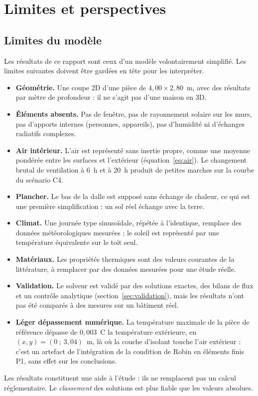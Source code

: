 \section{Limites et perspectives}\label{sec:limites}

\subsection{Limites du modèle}
Les résultats de ce rapport sont ceux d'un modèle volontairement simplifié. Les limites suivantes doivent
être gardées en tête pour les interpréter.
\begin{itemize}
	\item \textbf{Géométrie.} Une coupe 2D d'une pièce de $4{,}00\times2{,}80$~m, avec des résultats par mètre de
	profondeur : il ne s'agit pas d'une maison en 3D.
	\item \textbf{Éléments absents.} Pas de fenêtre, pas de rayonnement solaire sur les murs, pas d'apports
	internes (personnes, appareils), pas d'humidité ni d'échanges radiatifs complexes.
	\item \textbf{Air intérieur.} L'air est représenté sans inertie propre, comme une moyenne pondérée entre les
	surfaces et l'extérieur (équation~\eqref{eq:air}). Le changement brutal de ventilation à 6~h et à 20~h
	produit de petites marches sur la courbe du scénario C4.
	\item \textbf{Plancher.} Le bas de la dalle est supposé sans échange de chaleur, ce qui est une première
	simplification : un sol réel échange avec la terre.
	\item \textbf{Climat.} Une journée type sinusoïdale, répétée à l'identique, remplace des données
	météorologiques mesurées ; le soleil est représenté par une température équivalente sur le toit seul.
	\item \textbf{Matériaux.} Les propriétés thermiques sont des valeurs courantes de la littérature, à remplacer
	par des données mesurées pour une étude réelle.
	\item \textbf{Validation.} Le solveur est validé par des solutions exactes, des bilans de flux et un contrôle
	analytique (section~\ref{sec:validation}), mais les résultats n'ont pas été comparés à des mesures sur un
	bâtiment réel.
	\item \textbf{Léger dépassement numérique.} La température maximale de la pièce de référence dépasse de
	$0{,}003$~\textdegree C la température extérieure, en $(x,y)=(0\ ;\ 3{,}04)$~m, là où la couche d'isolant
	touche l'air extérieur : c'est un artefact de l'intégration de la condition de Robin en éléments finis P1,
	sans effet sur les conclusions.
\end{itemize}
Les résultats constituent une aide à l'étude : ils ne remplacent pas un calcul réglementaire. Le
\emph{classement} des solutions est plus fiable que les valeurs absolues.

